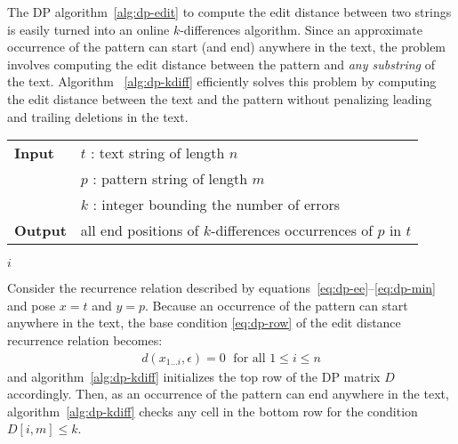 The DP algorithm~\ref{alg:dp-edit} to compute the edit distance between two strings is easily turned into an online $k$-differences algorithm.
Since an approximate occurrence of the pattern can start (and end) anywhere in the text, the problem involves computing the edit distance between the pattern and \emph{any substring} of the text.
Algorithm ~\ref{alg:dp-kdiff} efficiently solves this problem by computing the edit distance between the text and the pattern without penalizing leading and trailing deletions in the text.

\begin{figure*}[b]
\begin{center}
\begin{minipage}[t]{.9\textwidth}
\begin{algorithm}[H]
\begin{tabular}{ll}
\textbf{Input}  & $t$ : text string of length $n$\\
				& $p$ : pattern string of length $m$\\
				& $k$ : integer bounding the number of errors\\
\textbf{Output} & all end positions of $k$-differences occurrences of $p$ in $t$\\
\end{tabular}
\begin{algorithmic}[1]
\EndFor
{}
	\EndFor
		\State \Report $i$
	\EndIf
\EndFor
\end{algorithmic}
\label{alg:dp-kdiff}
\end{algorithm}
\end{minipage}
\end{center}
\end{figure*}

Consider the recurrence relation described by equations~\ref{eq:dp-ee}--\ref{eq:dp-min} and pose $x=t$ and $y=p$.
Because an occurrence of the pattern can start anywhere in the text, the base condition \ref{eq:dp-row} of the edit distance recurrence relation becomes:
\begin{eqnarray}
d(x_{1 \dots i}, \epsilon) = 0 \; \text{ for all } 1 \leq i \leq n\label{eq:dp-row-kdiff}
\end{eqnarray}
and algorithm~\ref{alg:dp-kdiff} initializes the top row of the DP matrix $D$ accordingly.
Then, as an occurrence of the pattern can end anywhere in the text, algorithm~\ref{alg:dp-kdiff} checks any cell in the bottom row for the condition $D[i,m] \leq k$.

